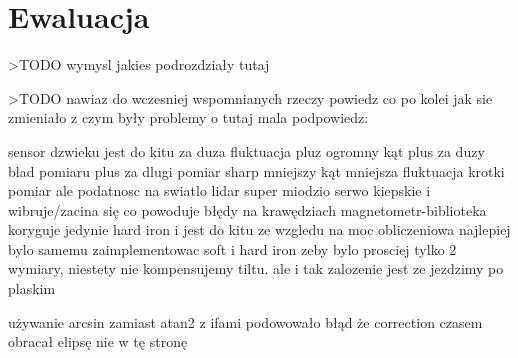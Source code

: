 \chapter{Ewaluacja}
>TODO wymysl jakies podrozdziały tutaj

>TODO nawiaz do wczesniej wspomnianych rzeczy
powiedz co po kolei jak sie zmieniało
z czym były problemy
o tutaj mala podpowiedz:

sensor dzwieku jest do kitu za duza fluktuacja pluz ogromny kąt plus za duzy blad pomiaru plus za dlugi pomiar
sharp mniejszy kąt mniejsza fluktuacja krotki pomiar ale podatnosc na swiatlo
lidar super miodzio
serwo kiepskie i wibruje/zacina się co powoduje błędy na krawędziach
magnetometr-biblioteka koryguje jedynie hard iron i jest do kitu
ze wzgledu na moc obliczeniowa najlepiej bylo samemu zaimplementowac soft i hard iron
zeby bylo prosciej tylko 2 wymiary, niestety nie kompensujemy tiltu. ale i tak zalozenie jest ze jezdzimy po plaskim

używanie arcsin zamiast atan2 z ifami podowowało błąd że correction czasem obracał elipsę nie w tę stronę